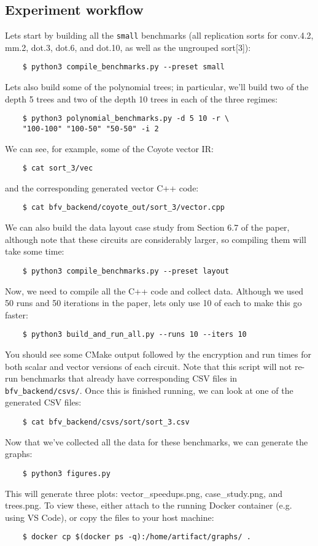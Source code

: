 \subsection{Experiment workflow}
Lets start by building all the {\tt small} benchmarks (all replication sorts for conv.4.2, mm.2, dot.3, dot.6, and dot.10, as well as the ungrouped sort[3]):
\begin{verbatim}
    $ python3 compile_benchmarks.py --preset small    
\end{verbatim}
Lets also build some of the polynomial trees; in particular, we'll build two of the depth 5 trees and two of the depth 10 trees in each of the three regimes:
\begin{verbatim}
    $ python3 polynomial_benchmarks.py -d 5 10 -r \
    "100-100" "100-50" "50-50" -i 2    
\end{verbatim}
We can see, for example, some of the Coyote vector IR:
\begin{verbatim}
    $ cat sort_3/vec    
\end{verbatim}
and the corresponding generated vector C++ code:
\begin{verbatim}
    $ cat bfv_backend/coyote_out/sort_3/vector.cpp    
\end{verbatim}
We can also build the data layout case study from Section 6.7 of the paper, although note that these circuits are considerably larger, so compiling them will take some time:
\begin{verbatim}
    $ python3 compile_benchmarks.py --preset layout    
\end{verbatim}
Now, we need to compile all the C++ code and collect data. Although we used 50 runs and 50 iterations in the paper, lets only use 10 of each to make this go faster:
\begin{verbatim}
    $ python3 build_and_run_all.py --runs 10 --iters 10    
\end{verbatim}
You should see some CMake output followed by the encryption and run times for both scalar and vector versions of each circuit. Note that this script will not re-run benchmarks that already have corresponding CSV files in {\tt bfv\_backend/csvs/}.
Once this is finished running, we can look at one of the generated CSV files:
\begin{verbatim}
    $ cat bfv_backend/csvs/sort/sort_3.csv    
\end{verbatim}
Now that we've collected all the data for these benchmarks, we can generate the graphs:
\begin{verbatim}
    $ python3 figures.py
\end{verbatim}
This will generate three plots: vector\_speedups.png, case\_study.png, and trees.png. To view these, either attach to the running Docker container (e.g. using VS Code), or copy the files to your host machine:
\begin{verbatim}
    $ docker cp $(docker ps -q):/home/artifact/graphs/ .    
\end{verbatim}



